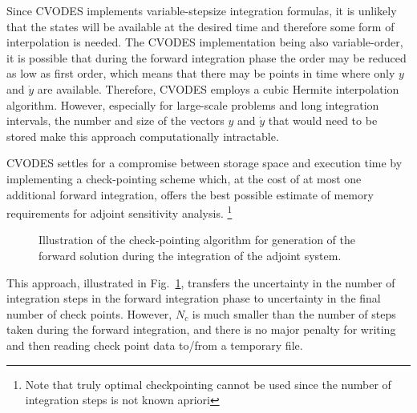 Since CVODES implements variable-stepsize integration formulas,
it is unlikely that the states will be available at the desired time and
therefore some form of interpolation is needed. The CVODES implementation
being also variable-order, it is possible that during the forward
integration phase the order may be reduced as low as first order,
which means that there may be points in time where only $y$ and ${\dot y}$
are available. Therefore, CVODES employs a cubic Hermite interpolation
algorithm. However, especially for large-scale problems and long integration
intervals, the number and size of the vectors $y$ and ${\dot y}$ that would 
need to be stored make this approach computationally intractable. 

CVODES settles for a compromise between storage space and execution time by
implementing a check-pointing scheme which, at the cost of
at most one additional forward integration, offers the best possible 
estimate of memory requirements for adjoint sensitivity analysis.
\footnote{Note that truly optimal checkpointing \cite{GrWa:00} cannot
be used since the number of integration steps is not known apriori} 
%
\begin{figure}
\centerline{}
\caption {Illustration of the check-pointing algorithm for generation of 
  the forward solution during the integration of the adjoint system.}
\label{f:ckpnt}
\end{figure}
This approach, illustrated in Fig.~\ref{f:ckpnt}, transfers the uncertainty in the number of integration
steps in the forward integration phase to uncertainty in the final number of check 
points. However, $N_c$ is much smaller than the number of steps taken during
the forward integration, and there is no major penalty for writing and then reading
check point data to/from a temporary file.
%


